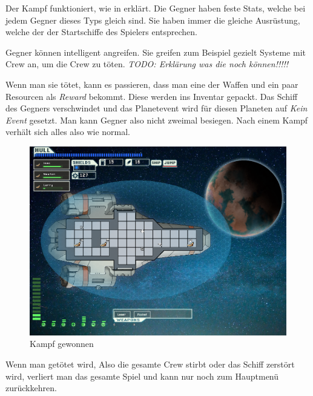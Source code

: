\documentclass[fontsize=12pt,paper=a4,twoside]{scrartcl}
\begin{document}
Der Kampf funktioniert, wie in  erklärt. Die Gegner haben feste Stats, welche bei jedem Gegner dieses Typs gleich sind. Sie haben immer die gleiche Ausrüstung, welche der der Startschiffe des Spielers entsprechen. 

Gegner können intelligent angreifen. Sie greifen zum Beispiel gezielt Systeme mit Crew an, um die Crew zu töten. \textit{TODO: Erklärung was die noch können!!!!!}

Wenn man sie tötet, kann es passieren, dass man eine der Waffen und ein paar Resourcen als \textit{Reward} bekommt. Diese werden ins Inventar gepackt. Das Schiff des Gegners verschwindet und das Planetevent wird für diesen Planeten auf \textit{Kein Event} gesetzt. Man kann Gegner also nicht zweimal besiegen. Nach einem Kampf verhält sich alles also wie normal. 

\begin{figure}[H]
\centering
\includegraphics[width=1\linewidth]{DasSpiel/Kampf/fightwin.png}
\caption{Kampf gewonnen}
\end{figure}

Wenn man getötet wird, Also die gesamte Crew stirbt oder das Schiff zerstört wird, verliert man das gesamte Spiel und kann nur noch zum Hauptmenü zurückkehren. 
\end{document}

